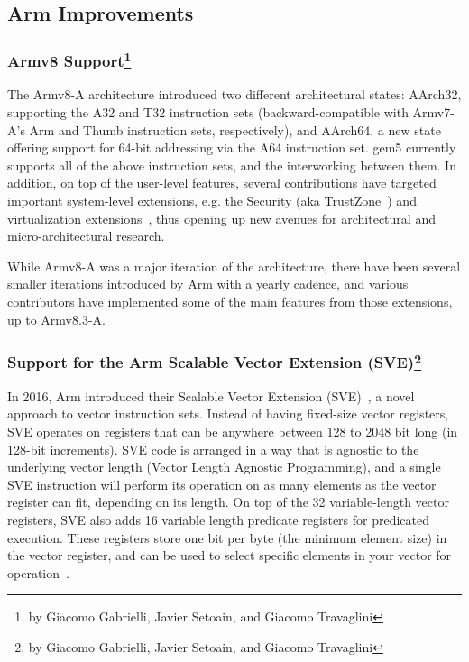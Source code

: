\subsection[Arm Improvements]{Arm Improvements}

\subsubsection[Armv8 Support]{Armv8 Support\footnote{by Giacomo Gabrielli, Javier Setoain, and Giacomo Travaglini}}

The Armv8-A architecture introduced two different architectural states:
AArch32, supporting the A32 and T32 instruction sets (backward-compatible with
Armv7-A's Arm and Thumb instruction sets, respectively), and AArch64, a new
state offering support for 64-bit addressing via the A64 instruction set. gem5
currently supports all of the above instruction sets, and the interworking
between them. In addition, on top of the user-level features, several
contributions have targeted important system-level extensions, e.g. the
Security (aka TrustZone~\cite{ArmTustZone}) and virtualization extensions~\cite{ArmARM}, thus opening up new
avenues for architectural and micro-architectural research.

While Armv8-A was a major iteration of the architecture, there have been
several smaller iterations introduced by Arm with a yearly cadence, and various
contributors have implemented some of the main features from those extensions,
up to Armv8.3-A.

\subsubsection[Support for the Arm Scalable Vector Extension (SVE)]{Support for the Arm Scalable Vector Extension (SVE)\footnote{by Giacomo Gabrielli, Javier Setoain, and Giacomo Travaglini}}

In 2016, Arm introduced their Scalable Vector Extension (SVE)~\cite{ArmARM}, a
novel approach to vector instruction sets. Instead of having fixed-size vector
registers, SVE operates on registers that can be anywhere between 128 to 2048
bit long (in 128-bit increments). SVE code is arranged in a way that is agnostic to the
underlying vector length (Vector Length Agnostic Programming), and a single SVE
instruction will perform its operation on as many elements as the vector
register can fit, depending on its length. On top of the 32 variable-length
vector registers, SVE also adds 16 variable length predicate registers for
predicated execution. These registers store one bit per byte (the minimum
element size) in the vector register, and can be used to select specific
elements in your vector for operation~\cite{white-paper-on-SVE-and-VLA-programming}.


